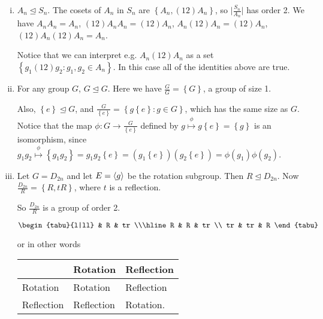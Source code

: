 \documentclass{article}
\theoremstyle{definition} \newtheorem*{definition}{Definition}
\begin{document}
\begin{exmps}\hfill \begin{enumerate}[(i)] \item $A_n \trianglelefteq S_n$. The
          cosets of $A_n$ in $S_n$ are $\left\{ A_n , (12)A_n\right\}$, so
          $\big|\frac{S_n}{A_n}\big|$ has order 2. We have $A_nA_n = A_n$,
          $(12)A_nA_n=(12)A_n$, $A_n(12)A_n=(12)A_n$, $(12)A_n(12)A_n=A_n$.

      Notice that we can interpret e.g. $A_n(12)A_n$ as a set $\left\{
      g_1(12)g_2 : g_1,g_2 \in A_n \right\}$. In this case all of the
      identities above are true.

    \item For any group $G$, $G \trianglelefteq G$. Here we have
      $\frac{G}{G}=\left\{ G \right\}$, a group of size 1.

      Also, $\left\{ e \right\} \trianglelefteq G$, and $\frac{G}{\left\{ e
      \right\}}=\left\{ g\left\{ e \right\}:g \in G \right\}$, which has the
      same size as $G$. Notice that the map $\phi : G \rightarrow
      \frac{G}{\left\{ e \right\}}$ defined by $g \overset{\phi}{\mapsto}
      g\left\{ e \right\}=\left\{ g \right\}$ is an isomorphism, since $g_1g_2
      \overset{\phi}{\mapsto} \left\{ g_1g_2 \right\}=g_1g_2\left\{ e
      \right\}=(g_1\left\{ e \right\})(g_2\left\{ e
      \right\})=\phi(g_1)\phi(g_2)$. 


\newpage \item Let $G=D_{2n}$ and let $E = \langle g \rangle$ be the rotation subgroup.
  Then $R \trianglelefteq D_{2n}$. Now $\frac{D_{2n}}{R}=\left\{ R,tR
  \right\}$, where $t$ is a reflection.

      So $\frac{D_{2n}}{R}$ is a group of order 2.

      \begin{table}[h] \centering $\begin{tabu}{l|ll} & R & tr \\\hline R & R &
          tr \\ tr & tr & R \end{tabu}$ \label{tab:d2ntable} \end{table} or in
      other words

      \begin{table}[h] \centering \begin{tabular}{l|ll} & Rotation &
          Reflection\\\hline Rotation & Rotation & Reflection\\ Reflection &
          Reflection & Rotation.  \end{tabular} \label{tab:rottable}
      \end{table}


\end{enumerate}
\end{exmps}
\end{document}
